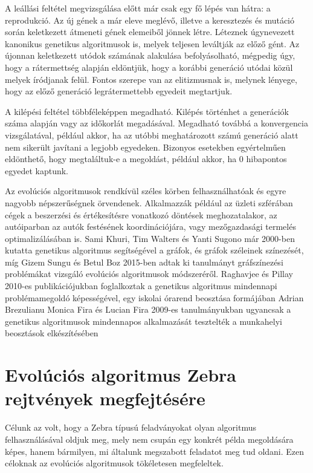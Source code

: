 \documentclass[12pt,a4paper,oneside]{report}
\begin{document}
A leállási feltétel megvizsgálása előtt már csak egy fő lépés van hátra: a reprodukció. 
Az új gének a már eleve meglévő, illetve a keresztezés és mutáció során keletkezett átmeneti gének elemeiből jönnek létre.
Léteznek úgynevezett kanonikus genetikus algoritmusok is, melyek teljesen leváltják az előző gént. 
Az újonnan keletkezett utódok számának alakulása befolyásolható, mégpedig úgy, hogy a rátermettség alapján eldöntjük, hogy a korábbi generáció utódai közül melyek íródjanak felül. 
Fontos szerepe van az elitizmusnak is, melynek lényege, hogy az előző generáció legrátermettebb egyedeit megtartjuk.

A kilépési feltétel többféleképpen megadható. Kilépés történhet a generációk száma alapján vagy az időkorlát megadásával. Megadható továbbá a konvergencia vizsgálatával, például akkor, ha az utóbbi meghatározott számú generáció alatt nem sikerült javítani a legjobb egyedeken. Bizonyos esetekben egyértelműen eldönthető, hogy megtaláltuk-e a megoldást, például akkor, ha 0 hibapontos egyedet kaptunk.

Az evolúciós algoritmusok rendkívül széles körben felhasználhatóak és egyre nagyobb népszerűségnek örvendenek.
Alkalmazzák például az üzleti szférában cégek a beszerzési és értékesítésre vonatkozó döntések meghozatalakor, az autóiparban az autók festésének koordinációjára, vagy mezőgazdasági termelés optimalizálásában is.
Sami Khuri, Tim Walters és Yanti Sugono már 2000-ben kutatta genetikus algoritmus segítségével a gráfok, és gráfok széleinek színezését\cite{Khuri:2000:GGA:335603.335880}, míg Gizem Sungu és Betul Boz 2015-ben adtak ki tanulmányt gráfszínezési problémákat vizsgáló evolúciós algoritmusok módszeréről\cite{Sungu:2015:EAW:2739482.2768488}.
Raghavjee és Pillay 2010-es publikációjukban foglalkoztak a genetikus algoritmus mindennapi problémamegoldó képességével, egy iskolai órarend beosztása formájában\cite{Raghavjee:2010:IGA:1899503.1899555}
Adrian Brezulianu Monica Fira és Lucian Fira 2009-es tanulmányukban ugyancsak a genetikus algoritmusok mindennapos alkalmazását tesztelték a munkahelyi beosztások elkészítésében\cite{Brezulianu:2009:GAA:1644993.1645085}


\chapter{Evolúciós algoritmus Zebra rejtvények megfejtésére} %
	Célunk az volt, hogy a Zebra típusú feladványokat olyan algoritmus felhasználásával oldjuk meg, mely nem csupán egy konkrét példa megoldására képes, hanem bármilyen, mi általunk megszabott feladatot meg tud oldani.
    Ezen céloknak az evolúciós algoritmusok tökéletesen megfeleltek.
\end{document}
